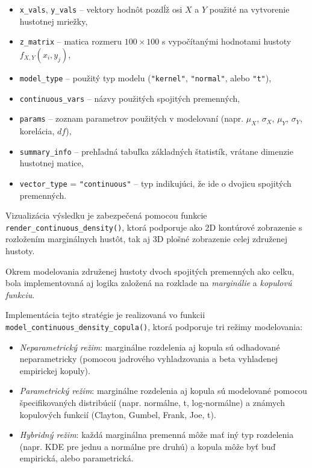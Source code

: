 \begin{itemize}
\setlength{\itemsep}{0pt}
  \setlength{\parskip}{0pt}
  \item \texttt{x\_vals}, \texttt{y\_vals} – vektory hodnôt pozdĺž osi $X$ a $Y$ použité na vytvorenie hustotnej mriežky,
  \item \texttt{z\_matrix} – matica rozmeru $100 \times 100$ s vypočítanými hodnotami hustoty $f_{X,Y}(x_i, y_j)$,
  \item \texttt{model\_type} – použitý typ modelu (\texttt{"kernel"}, \texttt{"normal"}, alebo \texttt{"t"}),
  \item \texttt{continuous\_vars} – názvy použitých spojitých premenných,
  \item \texttt{params} – zoznam parametrov použitých v modelovaní (napr. $\mu_X$, $\sigma_X$, $\mu_Y$, $\sigma_Y$, korelácia, $df$),
  \item \texttt{summary\_info} – prehľadná tabuľka základných štatistík, vrátane dimenzie hustotnej matice,
  \item \texttt{vector\_type} = \texttt{"continuous"} – typ indikujúci, že ide o dvojicu spojitých premenných.
\end{itemize}

Vizualizácia výsledku je zabezpečená pomocou funkcie \texttt{render\_continuous\_density()}, ktorá podporuje ako 2D kontúrové zobrazenie s rozložením marginálnych hustôt, tak aj 3D plošné zobrazenie celej združenej hustoty.

\bigskip

Okrem modelovania združenej hustoty dvoch spojitých premenných ako celku, bola implementovaná aj logika založená na rozklade na \textit{marginálie} a \textit{kopulovú funkciu}.

Implementácia tejto stratégie je realizovaná vo funkcii \texttt{model\_continuous\_density\_copula()}, ktorá podporuje tri režimy modelovania:

\begin{itemize}
\setlength{\itemsep}{0pt}
  \setlength{\parskip}{0pt}
  \item \textit{Neparametrický režim}: marginálne rozdelenia aj kopula sú odhadované neparametricky (pomocou jadrového vyhladzovania a beta vyhladenej empirickej kopuly).
  \item \textit{Parametrický režim}: marginálne rozdelenia aj kopula sú modelované pomocou špecifikovaných distribúcií (napr. normálne, t, log-normálne) a známych kopulových funkcií (Clayton, Gumbel, Frank, Joe, t).
  \item \textit{Hybridný režim}: každá marginálna premenná môže mať iný typ rozdelenia (napr. KDE pre jednu a normálne pre druhú) a kopula môže byť buď empirická, alebo parametrická.
\end{itemize}

